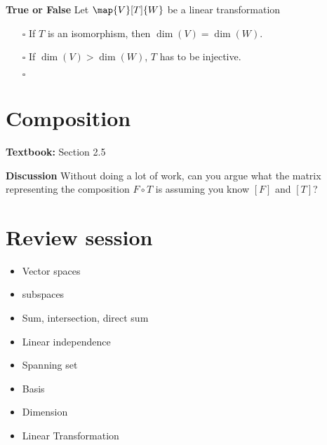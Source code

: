 \documentclass[letterpaper, 10pt]{article}
\begin{document}
\newpage
\lb
\textbf{True or False} 
Let $\map{V}[T]{W}$ be a linear transformation
\begin{enumerate}
    \item[$\square$]
        If $T$ is an isomorphism, then $\dim(V) = \dim(W)$.
    \item[$\square$]
        If $\dim(V) > \dim(W)$, $T$ has to be injective.
    \item[$\square$]
\end{enumerate}







\newpage
\section*{Composition}%
\textbf{Textbook:} Section 2.5



\lb
\textbf{Discussion}
\lb
Without doing a lot of work, can you argue what the matrix
representing the composition $F \circ T$ is assuming you know $[F]$ and $[T]$?








\newpage
\section*{Review session}%
\begin{itemize}
    \item Vector spaces
    \item subspaces
    \item Sum, intersection, direct sum
    \item Linear independence
    \item Spanning set
    \item Basis
    \item Dimension
    \item Linear Transformation
\end{itemize}
\end{document}
